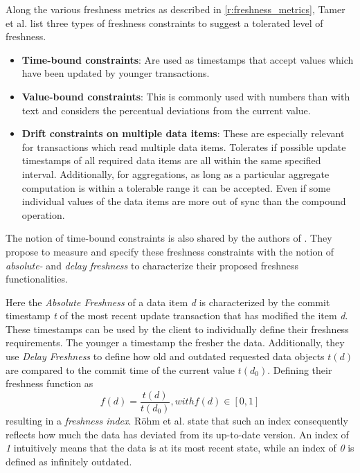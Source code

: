 Along the various freshness metrics as described in \ref{r:freshness_metrics}, Tamer et al. \cite{tamer:2005} list three types of freshness constraints
to suggest a tolerated level of freshness.
\begin{itemize}
    \item \textbf{Time-bound constraints}: Are used as timestamps that accept values which have been updated by younger transactions. 

    \item \textbf{Value-bound constraints}: This is commonly used with numbers than with text and considers the percentual deviations from the current value.

    \item \textbf{Drift constraints on multiple data items}: These are especially relevant for transactions which read multiple data items. Tolerates if possible 
    update timestamps of all required data items are all within the same specified interval. Additionally, for aggregations, as long as a particular aggregate computation 
    is within a tolerable range it can be accepted. Even if some individual values of the data items are more out of sync than the compound operation.
\end{itemize}

The notion of time-bound constraints is also shared by the authors of \cite{voicu:2010}. They propose to measure and specify these freshness constraints 
with the notion of \emph{absolute-} and \emph{delay freshness} to characterize their proposed freshness functionalities.

Here the \textit{Absolute Freshness} of a data item \textit{d} is characterized by the commit timestamp \textit{t} 
of the most recent update transaction that has modified the item \textit{d}.
These timestamps can be used by the client to individually define their freshness requirements. The younger a timestamp the fresher the data.
Additionally, they use \textit{Delay Freshness} to define how old and outdated requested data objects $t(d)$ are compared to the commit time of the current value $t(d_0)$.
Defining their freshness function as 
\begin{equation}
    f(d) = \frac{t(d)}{t(d_0)},  with f(d) \in [0,1]
\end{equation} 
resulting in a \emph{freshness index}.
Röhm et al. \cite{rohm:2002} state that such an index consequently reflects how much the data has deviated from its up-to-date version.
An index of \emph{1} intuitively means that the data is at its most recent state, while an index of \emph{0} is defined as infinitely outdated.

